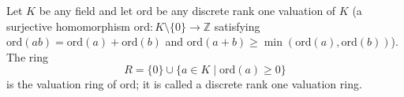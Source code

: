 Let $K$ be any field and let $\mathrm{ord}$ be any discrete rank one valuation of $K$ (a surjective homomorphism $\mathrm{ord}: K \setminus \{0\} \to \mathbb{Z}$ satisfying $\mathrm{ord}(ab) = \mathrm{ord}(a) + \mathrm{ord}(b)$ and $\mathrm{ord}(a+b) \geq \min(\mathrm{ord}(a), \mathrm{ord}(b))$). The ring
$$R = \{0\} \cup \{a \in K \mid \mathrm{ord}(a) \geq 0\}$$
is the valuation ring of $\mathrm{ord}$; it is called a discrete rank one valuation ring.

